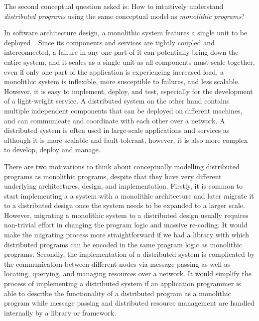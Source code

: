 \begin{center}
\vspace{-0.7em}
\vspace{-0.3em}
\end{center}

The second conceptual question asked is: How to intuitively understand \emph{distributed programs} using the same conceptual model as \emph{monolithic programs}?

In software architecture design, a monolithic system features a single unit to be deployed~\citep{Taylor09}. 
Since its components and services are tightly coupled and interconnected, a failure in any one part of it can potentially bring down the entire system, and it scales as a single unit as all components must scale together, even if only one part of the application is experiencing increased load, a monolithic system is inflexible, more susceptible to failures, and less scalable. However, it is easy to implement, deploy, and test, especially for the development of a light-weight service. A distributed system on the other hand contains multiple independent components that can be deployed on different machines, and can communicate and coordinate with each other over a network. A distributed system is often used in large-scale applications and services as although it is more scalable and fault-tolerant, however, it is also more complex to develop, deploy and manage. 

There are two motivations to think about conceptually modelling distributed programs as monolithic programs, despite that they have very different underlying architectures, design, and implementation.
Firstly, it is common to start implementing a a system with a monolithic architecture and later migrate it to a distributed design once the system needs to be expanded to a larger scale. However, migrating a monolithic system to a distributed design usually requires non-trivial effort in changing the program logic and massive re-coding. It would make the migrating process more straightforward if we had a library with which distributed programs can be encoded in the same program logic as monolithic programs.
Secondly, the implementation of a distributed system is complicated by the communication between different nodes via message passing as well as locating, querying, and managing resources over a network. It would simplify the process of implementing a distributed system if an application programmer is able to describe the functionality of a distributed program as a monolithic program while message passing and distributed resource management are handled internally by a library or framework.

